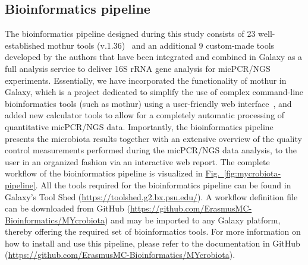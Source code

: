 \subsection*{Bioinformatics pipeline}
The bioinformatics pipeline designed during this study consists of 23 well-established mothur tools (v.1.36)~\cite{schloss2009introducing} and an additional 9 custom-made tools developed by the authors that have been integrated and combined in Galaxy as a full analysis service to deliver 16S rRNA gene analysis for micPCR/NGS experiments. Essentially, we have incorporated the functionality of mothur in Galaxy, which is a project dedicated to simplify the use of complex command-line bioinformatics tools (such as mothur) using a user-friendly web interface~\cite{giardine2005galaxy,blankenberg2010galaxy,goecks2010galaxy}, and added new calculator tools to allow for a completely automatic processing of quantitative micPCR/NGS data. Importantly, the bioinformatics pipeline presents the microbiota results together with an extensive overview of the quality control measurements performed during the micPCR/NGS data analysis, to the user in an organized fashion via an interactive web report. The complete workflow of the bioinformatics pipeline is visualized in \hyperref[fig:mycrobiota-pipeline]{Fig.~\ref{fig:mycrobiota-pipeline}}. All the tools required for the bioinformatics pipeline can be found in Galaxy’s Tool Shed (\url{https://toolshed.g2.bx.psu.edu/}). A workflow definition file can be downloaded from GitHub (\url{https://github.com/ErasmusMC-Bioinformatics/MYcrobiota}) and may be imported to any Galaxy platform, thereby offering the required set of bioinformatics tools. For more information on how to install and use this pipeline, please refer to the documentation in GitHub (\url{https://github.com/ErasmusMC-Bioinformatics/MYcrobiota}).

